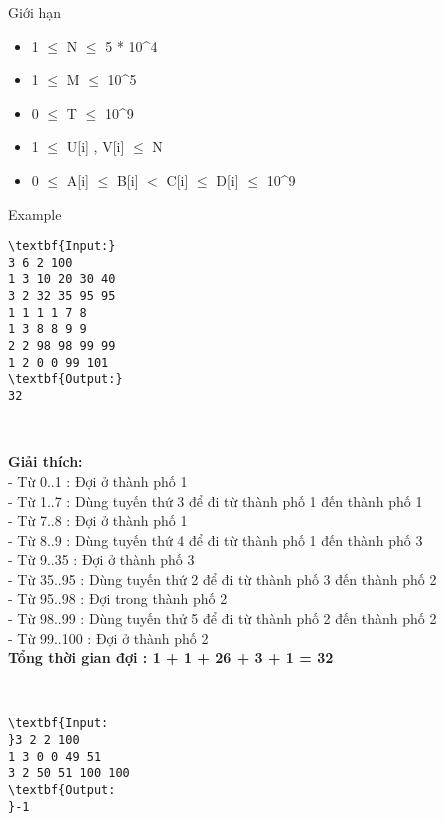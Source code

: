 Giới hạn
\begin{itemize}
	\item 1  $\le$  N  $\le$  5 * 10^4
	\item 1  $\le$  M  $\le$  10^5
	\item 0  $\le$  T  $\le$  10^9
	\item 1  $\le$  U[i] , V[i]  $\le$  N
	\item 0  $\le$  A[i]  $\le$  B[i] $<$ C[i]  $\le$  D[i]  $\le$  10^9
\end{itemize}
Example
\begin{verbatim}
\textbf{Input:}
3 6 2 100
1 3 10 20 30 40
3 2 32 35 95 95
1 1 1 1 7 8
1 3 8 8 9 9
2 2 98 98 99 99
1 2 0 0 99 101
\textbf{Output:}
32\end{verbatim}

 

\textbf{Giải thích:}
\\- Từ 0..1 : Đợi ở thành phố 1
\\- Từ 1..7 : Dùng tuyến thứ 3 để đi từ thành phố 1 đến thành phố 1
\\- Từ 7..8 : Đợi ở thành phố 1
\\- Từ 8..9 : Dùng tuyến thứ 4 để đi từ thành phố 1 đến thành phố 3
\\- Từ 9..35 : Đợi ở thành phố 3
\\- Từ 35..95 : Dùng tuyến thứ 2 để đi từ thành phố 3 đến thành phố 2
\\- Từ 95..98 : Đợi trong thành phố 2
\\- Từ 98..99 : Dùng tuyến thử 5 để đi từ thành phố 2 đến thành phố 2
\\- Từ 99..100 : Đợi ở thành phố 2
\\\textbf{Tổng thời gian đợi : 1 + 1 + 26 + 3 + 1 = 32}

 
\begin{verbatim}
\textbf{Input:
}3 2 2 100
1 3 0 0 49 51
3 2 50 51 100 100
\textbf{Output:
}-1
\end{verbatim}

 
